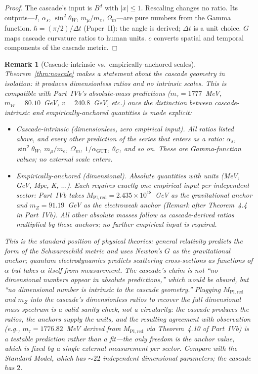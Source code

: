 \documentclass[12pt,a4paper]{article}
\newtheorem*{remark}{Remark}
\begin{document}
\begin{proof}
The cascade's input is $B^d$ with $|x| \leq 1$. Rescaling changes no
ratio. Its outputs---$I$, $\alpha_s$, $\sin^2\theta_W$, $m_\mu/m_e$,
$\Omega_m$---are pure numbers from the Gamma function. $\hbar = (\pi/2)/\Delta t$ (Paper~II): the angle is derived; $\Delta t$ is a unit
choice. $G$ maps cascade curvature ratios to human units. $c$ converts
spatial and temporal components of the cascade metric.
\end{proof}

\begin{remark}[Cascade-intrinsic vs.\ empirically-anchored scales]\label{rem:sp24-status}
Theorem~\ref{thm:noscale} makes a statement about the cascade geometry
in isolation: it produces dimensionless ratios and no intrinsic
scales. This is compatible with Part~IVb's absolute-mass predictions
($m_\tau = 1777$~MeV, $m_W = 80.10$~GeV, $v = 240.8$~GeV, etc.) once
the distinction between \emph{cascade-intrinsic} and
\emph{empirically-anchored} quantities is made explicit:
\begin{itemize}
\item \emph{Cascade-intrinsic (dimensionless, zero empirical input).}
All ratios listed above, and every other prediction of the series
that enters as a ratio: $\alpha_s$, $\sin^2\theta_W$, $m_\mu/m_e$,
$\Omega_m$, $1/\alpha_{\mathrm{GUT}}$, $\theta_C$, and so on. These
are Gamma-function values; no external scale enters.
\item \emph{Empirically-anchored (dimensional).} Absolute quantities
with units (MeV, GeV, Mpc, K, $\ldots$). Each requires exactly one
empirical input per independent sector: Part~IVb takes
$M_{\mathrm{Pl,red}} = 2.435\times 10^{18}$~GeV as the gravitational
anchor and $m_Z = 91.19$~GeV as the electroweak anchor
(Remark after Theorem~4.4 in Part~IVb). All other absolute masses
follow as cascade-derived ratios multiplied by these anchors; no
further empirical input is required.
\end{itemize}
This is the standard position of physical theories: general
relativity predicts the form of the Schwarzschild metric and uses
Newton's $G$ as the gravitational anchor; quantum electrodynamics
predicts scattering cross-sections as functions of $\alpha$ but takes
$\alpha$ itself from measurement. The cascade's claim is not ``no
dimensional numbers appear in absolute predictions,'' which would be
absurd, but ``no dimensional number is intrinsic to the cascade
geometry.'' Plugging $M_{\mathrm{Pl,red}}$ and $m_Z$ into the
cascade's dimensionless ratios to recover the full dimensional mass
spectrum is a valid sanity check, not a circularity: the cascade
produces the ratios, the anchors supply the units, and the resulting
agreement with observation (e.g., $m_\tau = 1776.82$~MeV derived from
$M_{\mathrm{Pl,red}}$ via Theorem~4.10 of Part~IVb) is a testable
prediction rather than a fit---the only freedom is the anchor value,
which is fixed by a single external measurement per sector. Compare
with the Standard Model, which has $\sim 22$ independent dimensional
parameters; the cascade has $2$.
\end{remark}
\end{document}
